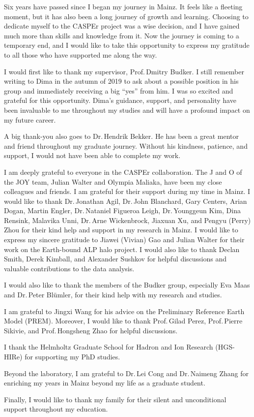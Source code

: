 
Six years have passed since I began my journey in Mainz.
It feels like a fleeting moment, but it has also been a long journey of growth and learning.
Choosing to dedicate myself to the CASPEr project was a wise decision, and I have gained much more than skills and knowledge from it.
Now the journey is coming to a temporary end, and I would like to take this opportunity to express my gratitude to all those who have supported me along the way.


I would first like to thank my supervisor, Prof.\,Dmitry Budker.
I still remember writing to Dima in the autumn of 2019 to ask about a possible position in his group and immediately receiving a big ``yes'' from him.
I was so excited and grateful for this opportunity.
Dima's guidance, support, and personality have been invaluable to me throughout my studies and will have a profound impact on my future career.


A big thank-you also goes to Dr.\,Hendrik Bekker.
He has been a great mentor and friend throughout my graduate journey.
Without his kindness, patience, and support, I would not have been able to complete my work.


I am deeply grateful to everyone in the CASPEr collaboration.
The J and O of the JOY team, Julian Walter and Olympia Maliaka, have been my close colleagues and friends.
I am grateful for their support during my time in Mainz.
I would like to thank Dr.\,Jonathan Agil, Dr.\,John Blanchard, Gary Centers, Arian Dogan, Martin Engler, Dr.\,Nataniel Figueroa Leigh, Dr.\,Younggeun Kim, Dina Rensink, Malavika Unni, Dr.\,Arne Wickenbrock, Jiaxuan Xu, and Pengyu (Perry) Zhou for their kind help and support in my research in Mainz.
I would like to express my sincere gratitude to Jiawei (Vivian) Gao and Julian Walter for their work on the Earth-bound ALP halo project.
I would also like to thank Declan Smith, Derek Kimball, and Alexander Sushkov for helpful discussions and valuable contributions to the data analysis.

I would also like to thank the members of the Budker group, especially Eva Maas and Dr.\,Peter Blümler, for their kind help with my research and studies.

I am grateful to Jingxi Wang for his advice on the Preliminary Reference Earth Model (PREM).
Moreover, I would like to thank Prof.\,Gilad Perez, Prof.\,Pierre Sikivie, and Prof.\,Hongsheng Zhao for helpful discussions.

I thank the Helmholtz Graduate School for Hadron and Ion Research (HGS-HIRe) for supporting my PhD studies.

Beyond the laboratory, I am grateful to Dr.\,Lei Cong and Dr.\,Naimeng Zhang for enriching my years in Mainz beyond my life as a graduate student.

Finally, I would like to thank my family for their silent and unconditional support throughout my education.
